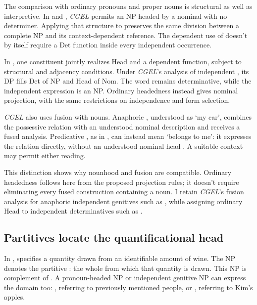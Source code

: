 \documentclass[12pt]{article}
\begin{document}
The comparison with ordinary pronouns and proper nouns is structural as well as interpretive. In  and , \textit{CGEL} permits an NP headed by a nominal with no determiner. Applying that structure to  preserves the same division between a complete NP and its context-dependent reference. The dependent use of  doesn't by itself require a Det function inside every independent occurrence.

In \textcite{Payne2007}, one constituent jointly realizes Head and a dependent function, subject to structural and adjacency conditions. Under \textit{CGEL}'s analysis of independent , its DP fills Det of NP and Head of Nom. The word remains determinative, while the independent expression is an NP. Ordinary headedness instead gives  nominal projection, with the same restrictions on independence and form selection.

\textit{CGEL} also uses fusion with nouns. Anaphoric , understood as \enquote*{my car}, combines the possessive relation with an understood nominal description and receives a fused analysis. Predicative , as in , can instead mean \enquote*{belongs to me}: it expresses the relation directly, without an understood nominal head \citep[410--411, 470--471]{huddleston2002}. A suitable context may permit either reading.

This distinction shows why nounhood and fusion are compatible. Ordinary headedness follows here from the proposed projection rules; it doesn't require eliminating every fused construction containing a noun. I retain \textit{CGEL}'s fusion analysis for anaphoric independent genitives such as , while assigning ordinary Head to independent determinatives such as .

\subsection{Partitives locate the quantificational head}

In ,  specifies a quantity drawn from an identifiable amount of wine. The NP  denotes the partitive : the whole from which that quantity is drawn. This NP is complement of . A pronoun-headed NP or independent genitive NP can express the domain too: , referring to previously mentioned people, or , referring to Kim's apples.
\end{document}
